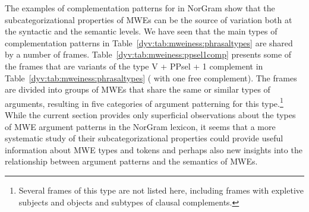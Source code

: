 \documentclass[output=paper]{langsci/langscibook}
\begin{document}
The examples of complementation patterns for  in NorGram show that the subcategorizational properties of MWEs can be the source of variation both at the syntactic and the semantic levels. 
We have seen that the main types of complementation patterns in Table~\ref{dyv:tab:mweiness:phrasaltypes} are shared by a number of  frames. %
Table~\ref{dyv:tab:mweiness:ppsel1comp} presents some of the frames that are variants of the type \textsf{V + PPsel} + 1 complement in Table~\ref{dyv:tab:mweiness:phrasaltypes} ( with one free complement). 
The frames are divided into groups of MWEs that share the same or similar types of arguments, resulting in five categories of argument patterning for this type.\footnote{Several frames of this type are not listed here, including frames with expletive subjects and objects and subtypes of clausal complements.} 
While the current section provides only superficial observations about the types of MWE argument patterns in the NorGram lexicon, it seems that a more systematic study of their subcategorizational properties could provide useful information about MWE types and tokens and perhaps also new insights into the relationship between argument patterns and the semantics of MWEs.
 
\end{document}
